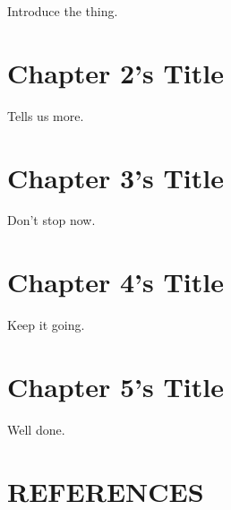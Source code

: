\documentclass[]{dissertateCICESE}
\begin{document}
Introduce the thing.

\FloatBarrier

\newpage
{}
\fancyhead[R]{\thepage}
\fancyfoot[C]{}

\chapter{Chapter 2's Title}

Tells us more.

\FloatBarrier

\newpage
{}
\fancyhead[R]{\thepage}
\fancyfoot[C]{}

\chapter{Chapter 3's Title}

Don't stop now.

\FloatBarrier
\newpage
{}
\fancyhead[R]{\thepage}
\fancyfoot[C]{}

\chapter{Chapter 4's Title}

Keep it going.

\FloatBarrier
\newpage
{}
\fancyhead[R]{\thepage}
\fancyfoot[C]{}

\chapter{Chapter 5's Title}

Well done.

\FloatBarrier

\newpage
{}
\fancyhead[R]{\thepage}
\fancyfoot[C]{}

\chapter*{REFERENCES}

\setlength{\parindent}{-0.5in}
\setlength{\leftskip}{0.4in}
\setlength{\parskip}{6pt}

\noindent
\end{document}
